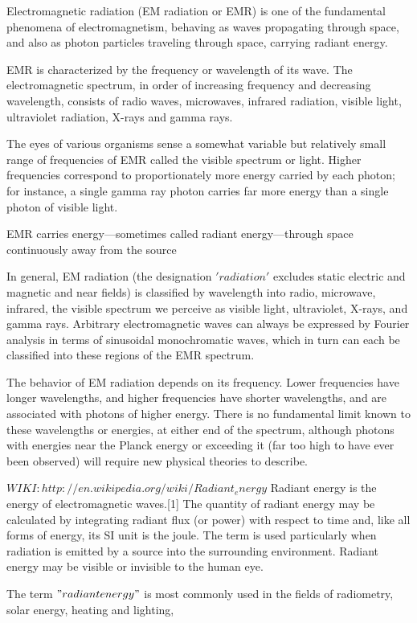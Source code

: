 Electromagnetic radiation (EM radiation or EMR) is one of the fundamental phenomena of electromagnetism, behaving as waves propagating through space, and also as photon particles traveling through space, carrying radiant energy.

EMR is characterized by the frequency or wavelength of its wave. The electromagnetic spectrum, in order of increasing frequency and decreasing wavelength, consists of radio waves, microwaves, infrared radiation, visible light, ultraviolet radiation, X-rays and gamma rays. 

The eyes of various organisms sense a somewhat variable but relatively small range of frequencies of EMR called the visible spectrum or light. Higher frequencies correspond to proportionately more energy carried by each photon; for instance, a single gamma ray photon carries far more energy than a single photon of visible light.

EMR carries energy—sometimes called radiant energy—through space continuously away from the source

In general, EM radiation (the designation $'radiation'$ excludes static electric and magnetic and near fields) is classified by wavelength into radio, microwave, infrared, the visible spectrum we perceive as visible light, ultraviolet, X-rays, and gamma rays. Arbitrary electromagnetic waves can always be expressed by Fourier analysis in terms of sinusoidal monochromatic waves, which in turn can each be classified into these regions of the EMR spectrum.

The behavior of EM radiation depends on its frequency. Lower frequencies have longer wavelengths, and higher frequencies have shorter wavelengths, and are associated with photons of higher energy. There is no fundamental limit known to these wavelengths or energies, at either end of the spectrum, although photons with energies near the Planck energy or exceeding it (far too high to have ever been observed) will require new physical theories to describe.

$WIKI: http://en.wikipedia.org/wiki/Radiant_energy$
Radiant energy is the energy of electromagnetic waves.[1] The quantity of radiant energy may be calculated by integrating radiant flux (or power) with respect to time and, like all forms of energy, its SI unit is the joule. The term is used particularly when radiation is emitted by a source into the surrounding environment. Radiant energy may be visible or invisible to the human eye.

The term $"radiant energy"$ is most commonly used in the fields of radiometry, solar energy, heating and lighting,


